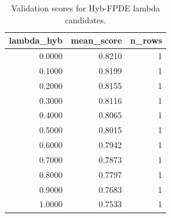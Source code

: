 \begin{table}[t]
\caption{Validation scores for Hyb-FPDE lambda candidates.}
\label{tab:lambda_distribution_computed}
\centering
\begin{tabular}{rrr}
\toprule
lambda\_hyb & mean\_score & n\_rows \\
\midrule
0.0000 & 0.8210 & 1 \\
0.1000 & 0.8199 & 1 \\
0.2000 & 0.8155 & 1 \\
0.3000 & 0.8116 & 1 \\
0.4000 & 0.8065 & 1 \\
0.5000 & 0.8015 & 1 \\
0.6000 & 0.7942 & 1 \\
0.7000 & 0.7873 & 1 \\
0.8000 & 0.7797 & 1 \\
0.9000 & 0.7683 & 1 \\
1.0000 & 0.7533 & 1 \\
\bottomrule
\end{tabular}

\end{table}
